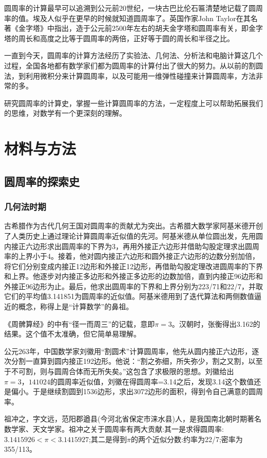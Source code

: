 \documentclass[12pt,a4paper]{ctexart}
\begin{document}
	圆周率的计算最早可以追溯到公元前20世纪，一块古巴比伦石匾清楚地记载了圆周率的值。埃及人似乎在更早的时候就知道圆周率了。英国作家John Taylor在其名著《金字塔》中指出，造于公元前2500年左右的胡夫金字塔和圆周率有关，即金字塔的周长和高度之比等于圆周率的两倍，正好等于圆的周长和半径之比。
	
	一直到今天，圆周率的计算方法经历了实验法、几何法、分析法和电脑计算这几个过程，全国各地都有数学家们都为圆周率的计算付出了很大的努力\cite{RN21}。从以前的割圆法，到利用微积分来计算圆周率\cite{RN20}，以及可能用一维弹性碰撞来计算圆周率\cite{RN23}，方法非常的多。
	
	研究圆周率的计算史，掌握一些计算圆周率的方法，一定程度上可以帮助拓展我们的思维，对数学有一个更深刻的理解。
	\section{材料与方法}
	\subsection{圆周率的探索史}
	\subsubsection{几何法时期}
	古希腊作为古代几何王国对圆周率的贡献尤为突出。古希腊大数学家阿基米德开创了人类历史上通过理论计算圆周率近似值的先河。阿基米德从单位圆出发，先用圆内接正六边形求出圆周率的下界为3，再用外接正六边形并借助勾股定理求出圆周率的上界小于4。接着，他对圆内接正六边形和圆外接正六边形的边数分别加倍，将它们分别变成内接正12边形和外接正12边形，再借助勾股定理改进圆周率的下界和上界。他逐步对内接正多边形和外接正多边形的边数加倍，直到内接正96边形和外接正96边形为止。最后，他求出圆周率的下界和上界分别为223/71和22/7，并取它们的平均值3.141851为圆周率的近似值。阿基米德用到了迭代算法和两侧数值逼近的概念，称得上是“计算数学”的鼻祖\cite{RN21}。
	
	《周髀算经》的中有“径一而周三”的记载，意即$\pi=3$。汉朝时，张衡得出3.162的结果。这个值不太准确，但它简单易理解。
	
	公元263年，中国数学家刘徽用“割圆术”计算圆周率，他先从圆内接正六边形，逐次分割一直算到圆内接正192边形。他说：“割之弥细，所失弥少，割之又割，以至于不可割，则与圆周合体而无所失矣。”这包含了求极限的思想。刘徽给出$\pi=3，141024$的圆周率近似值，刘徽在得圆周率=3.14之后，发现3.14这个数值还是偏小。于是继续割圆到1536边形，求出3072边形的面积，得到令自己满意的圆周率\cite{RN21}。
	
	祖冲之，字文远，范阳郡遒县(今河北省保定市涞水县)人，是我国南北朝时期著名数学家、天文学家。祖冲之关于圆周率有两大贡献:其一是求得圆周率:$3.1415926<\pi<3.1415927$;其二是得到$\pi$的两个近似分数:约率为22/7;密率为355/113。
	
\end{document}
